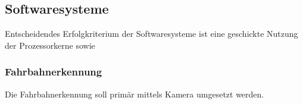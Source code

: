 \subsection{Softwaresysteme}
Entscheidendes Erfolgkriterium der Softwaresysteme ist eine geschickte Nutzung der Prozessorkerne sowie 
\subsubsection{Fahrbahnerkennung}
Die Fahrbahnerkennung soll primär mittels Kamera umgesetzt werden.